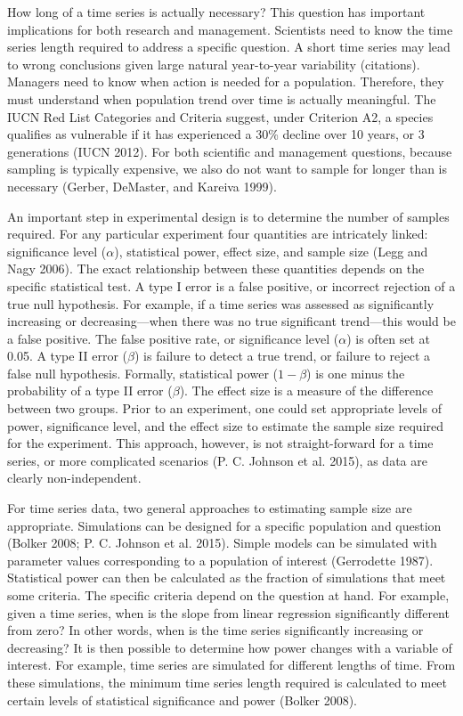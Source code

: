 \documentclass[12pt,]{article}
\begin{document}
How long of a time series is actually necessary? This question has
important implications for both research and management. Scientists need
to know the time series length required to address a specific question.
A short time series may lead to wrong conclusions given large natural
year-to-year variability (citations). Managers need to know when action
is needed for a population. Therefore, they must understand when
population trend over time is actually meaningful. The IUCN Red List
Categories and Criteria suggest, under Criterion A2, a species qualifies
as vulnerable if it has experienced a 30\% decline over 10 years, or 3
generations (IUCN 2012). For both scientific and management questions,
because sampling is typically expensive, we also do not want to sample
for longer than is necessary (Gerber, DeMaster, and Kareiva 1999).

An important step in experimental design is to determine the number of
samples required. For any particular experiment four quantities are
intricately linked: significance level (\(\alpha\)), statistical power,
effect size, and sample size (Legg and Nagy 2006). The exact
relationship between these quantities depends on the specific
statistical test. A type I error is a false positive, or incorrect
rejection of a true null hypothesis. For example, if a time series was
assessed as significantly increasing or decreasing---when there was no
true significant trend---this would be a false positive. The false
positive rate, or significance level (\(\alpha\)) is often set at 0.05.
A type II error (\(\beta\)) is failure to detect a true trend, or
failure to reject a false null hypothesis. Formally, statistical power
(\(1-\beta\)) is one minus the probability of a type II error
(\(\beta\)). The effect size is a measure of the difference between two
groups. Prior to an experiment, one could set appropriate levels of
power, significance level, and the effect size to estimate the sample
size required for the experiment. This approach, however, is not
straight-forward for a time series, or more complicated scenarios (P. C.
Johnson et al. 2015), as data are clearly non-independent.

For time series data, two general approaches to estimating sample size
are appropriate. Simulations can be designed for a specific population
and question (Bolker 2008; P. C. Johnson et al. 2015). Simple models can
be simulated with parameter values corresponding to a population of
interest (Gerrodette 1987). Statistical power can then be calculated as
the fraction of simulations that meet some criteria. The specific
criteria depend on the question at hand. For example, given a time
series, when is the slope from linear regression significantly different
from zero? In other words, when is the time series significantly
increasing or decreasing? It is then possible to determine how power
changes with a variable of interest. For example, time series are
simulated for different lengths of time. From these simulations, the
minimum time series length required is calculated to meet certain levels
of statistical significance and power (Bolker 2008).
\end{document}
